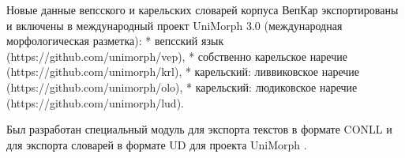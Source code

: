 Новые данные вепсского и карельских словарей корпуса ВепКар экспортированы и включены в международный проект UniMorph 3.0 (международная морфологическая разметка):
* вепсский язык (https://github.com/unimorph/vep),
* собственно карельское наречие (https://github.com/unimorph/krl),
* карельский: ливвиковское наречие (https://github.com/unimorph/olo),
* карельский: людиковское наречие (https://github.com/unimorph/lud).

Был разработан специальный модуль для экспорта текстов в формате CONLL и 
для экспорта словарей в формате UD для проекта UniMorph .












